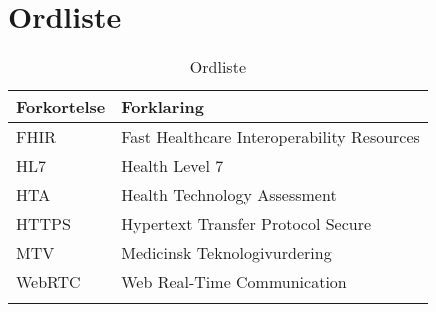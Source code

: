 \chapter{Ordliste}

\begin{longtabu} to 
	\textbf{Forkortelse} & \textbf{Forklaring} \\[-1ex]
	\midrule
	FHIR & Fast Healthcare Interoperability Resources \\[-1ex]
	HL7 & Health Level 7 \\[-1ex]
	 HTA & Health Technology Assessment \\[-1ex]
	 HTTPS & Hypertext Transfer Protocol Secure \\[-1ex]
	 MTV & Medicinsk Teknologivurdering \\[-1ex]
	 
	 WebRTC & Web Real-Time Communication \\[-1ex] 



	\caption{Ordliste}
\end{longtabu}

